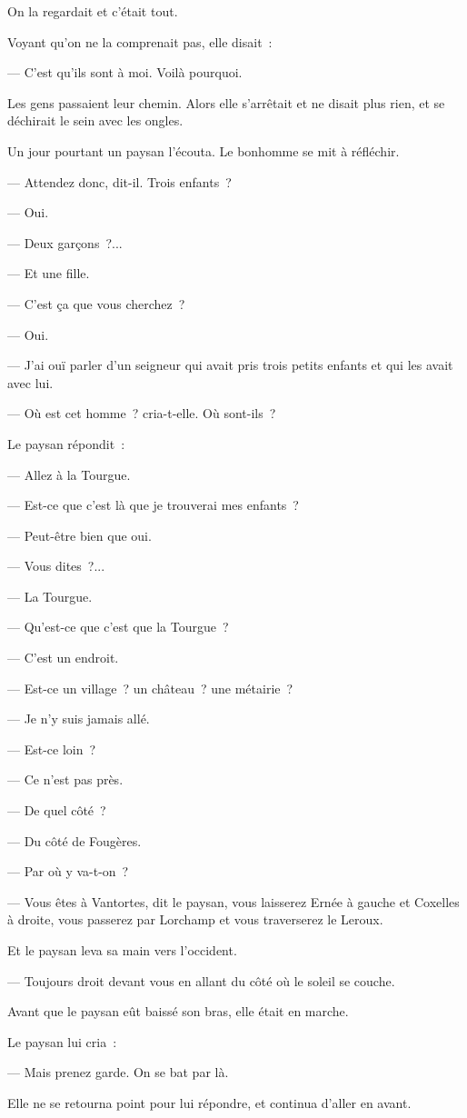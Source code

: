 \documentclass[french,twoside]{book} %
\begin{document}
On la regardait et c’était tout.\par
Voyant qu’on ne la comprenait pas, elle disait :\par
— C’est qu’ils sont à moi. Voilà pourquoi.\par
Les gens passaient leur chemin. Alors elle s’arrêtait et ne disait plus rien, et se déchirait le sein avec les ongles.\par
Un jour pourtant un paysan l’écouta. Le bonhomme se mit à réfléchir.\par
— Attendez donc, dit-il. Trois enfants ?\par
— Oui.\par
— Deux garçons ?...\par
— Et une fille.\par
— C’est ça que vous cherchez ?\par
— Oui.\par
— J’ai ouï parler d’un seigneur qui avait pris trois petits enfants et qui les avait avec lui.\par
 — Où est cet homme ? cria-t-elle. Où sont-ils ?\par
Le paysan répondit :\par
— Allez à la Tourgue.\par
— Est-ce que c’est là que je trouverai mes enfants ?\par
— Peut-être bien que oui.\par
— Vous dites ?...\par
— La Tourgue.\par
— Qu’est-ce que c’est que la Tourgue ?\par
— C’est un endroit.\par
— Est-ce un village ? un château ? une métairie ?\par
— Je n’y suis jamais allé.\par
— Est-ce loin ?\par
— Ce n’est pas près.\par
— De quel côté ?\par
— Du côté de Fougères.\par
— Par où y va-t-on ?\par
— Vous êtes à Vantortes, dit le paysan, vous laisserez Ernée à gauche et Coxelles à droite, vous passerez par Lorchamp et vous traverserez le Leroux.\par
Et le paysan leva sa main vers l’occident.\par
— Toujours droit devant vous en allant du côté où le soleil se couche.\par
Avant que le paysan eût baissé son bras, elle était en marche.\par
Le paysan lui cria :\par
— Mais prenez garde. On se bat par là.\par
Elle ne se retourna point pour lui répondre, et continua d’aller en avant.
\end{document}
